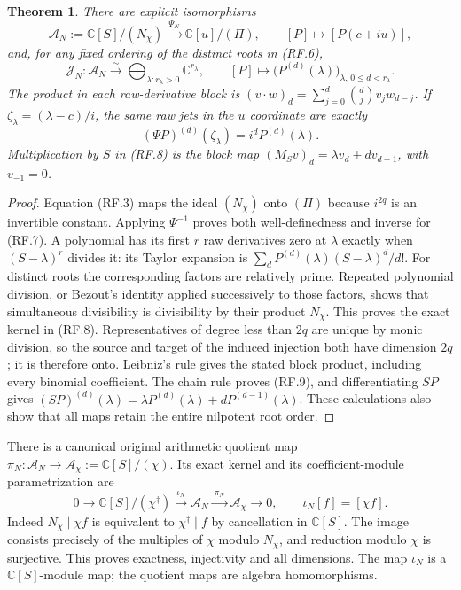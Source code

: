 \documentclass[11pt]{article}
\newtheorem{theorem}{Theorem}
\newcommand{\C}{\mathbb C}
\newcommand{\A}{\mathcal A}
\newcommand{\J}{\mathcal J}
\begin{document}
\begin{theorem}
There are explicit isomorphisms
\[
 \A_N:=\C[S]/(N_\chi)
 \xrightarrow{\ \Psi_N\ }\C[u]/(\Pi),\qquad
 [P]\longmapsto[P(c+iu)],
 \tag{RF.7}
\]
and, for any fixed ordering of the distinct roots in (RF.6),
\[
 \J_N:\A_N\xrightarrow{\sim}
 \bigoplus_{\lambda:r_\lambda>0}\C^{r_\lambda},\qquad
 [P]\longmapsto
       \bigl(P^{(d)}(\lambda)\bigr)_{\lambda,\,0\le d<r_\lambda}.
 \tag{RF.8}
\]
The product in each raw-derivative block is
$(v\cdot w)_d=\sum_{j=0}^d\binom dj v_jw_{d-j}$.
If $\zeta_\lambda=(\lambda-c)/i$, the same raw jets in the $u$
coordinate are exactly
\[
 (\Psi P)^{(d)}(\zeta_\lambda)=i^dP^{(d)}(\lambda).
 \tag{RF.9}
\]
Multiplication by $S$ in (RF.8) is the block map
$(M_Sv)_d=\lambda v_d+d v_{d-1}$, with $v_{-1}=0$.
\end{theorem}

\begin{proof}
Equation (RF.3) maps the ideal $(N_\chi)$ onto $(\Pi)$ because
$i^{2q}$ is an invertible constant. Applying $\Psi^{-1}$ proves
both well-definedness and inverse for (RF.7).
A polynomial has its first $r$ raw derivatives zero at $\lambda$
exactly when $(S-\lambda)^r$ divides it: its Taylor expansion is
$\sum_d P^{(d)}(\lambda)(S-\lambda)^d/d!$. For distinct roots
the corresponding factors are relatively prime. Repeated polynomial
division, or Bezout's identity applied successively to those factors,
shows that simultaneous divisibility is divisibility by their product
$N_\chi$. This proves the exact kernel in (RF.8).
Representatives of degree less than $2q$ are unique by monic division,
so the source and target of the induced injection both have dimension
$2q$; it is therefore onto. Leibniz's rule gives the stated block
product, including every binomial coefficient. The chain rule proves
(RF.9), and differentiating $SP$ gives
$(SP)^{(d)}(\lambda)=\lambda P^{(d)}(\lambda)
+dP^{(d-1)}(\lambda)$. These calculations also show that all maps
retain the entire nilpotent root order.
\end{proof}

There is a canonical original arithmetic quotient map
$\pi_N:\A_N\to\A_\chi:=\C[S]/(\chi)$.
Its exact kernel and its coefficient-module parametrization are
\[
 0\longrightarrow\C[S]/(\chi^\dagger)
 \xrightarrow{\ \iota_N\ }\A_N
 \xrightarrow{\ \pi_N\ }\A_\chi\longrightarrow0,
 \qquad\iota_N[f]=[\chi f].
 \tag{RF.10}
\]
Indeed $N_\chi\mid\chi f$ is equivalent to
$\chi^\dagger\mid f$ by cancellation in $\C[S]$.
The image consists precisely of the multiples of $\chi$ modulo
$N_\chi$, and reduction modulo $\chi$ is surjective. This proves
exactness, injectivity and all dimensions. The map $\iota_N$ is a
$\C[S]$-module map; the quotient maps are algebra homomorphisms.
\end{document}

